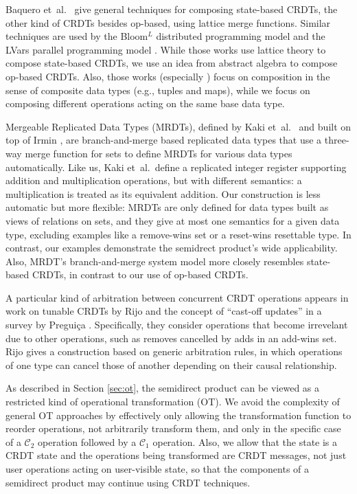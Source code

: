 \documentclass[acmsmall,nonacm,12pt]{acmart}
\newcommand{\mc}[1]{\ensuremath{\mathcal{#1}}}
\theoremstyle{plain}
\theoremstyle{definition}
\begin{document}
Baquero et~al.\ \cite{state_based_patterns} give general techniques for composing state-based CRDTs, the other kind of CRDTs besides op-based, using lattice merge functions.  Similar techniques are used by the Bloom$\mbox{}^L$ distributed programming model \cite{bloom_lattices} and the LVars parallel programming model \cite{lvars}.  While those works use lattice theory to compose state-based CRDTs, we use an idea from abstract algebra to compose op-based CRDTs.  Also, those works (especially \cite{bloom_lattices, lvars}) focus on composition in the sense of composite data types (e.g., tuples and maps), while we focus on composing different operations acting on the same base data type.

Mergeable Replicated Data Types (MRDTs), defined by Kaki et~al.\ \cite{mrdts} and built on top of Irmin \cite{irmin}, are branch-and-merge based replicated data types that use a three-way merge function for sets to define MRDTs for various data types automatically.  Like us, Kaki et~al.\ define a replicated integer register supporting addition and multiplication operations, but with different semantics: a multiplication is treated as its equivalent addition.  Our construction is less automatic but more flexible: MRDTs are only defined for data types built as views of relations on sets, and they give at most one semantics for a given data type, excluding examples like a remove-wins set or a reset-wins resettable type.  In contrast, our examples demonstrate the semidrect product's wide applicability.  Also, MRDT's branch-and-merge system model more closely resembles state-based CRDTs, in contrast to our use of op-based CRDTs.

A particular kind of arbitration between concurrent CRDT operations appears in work on tunable CRDTs by Rijo \cite{tunable_crdts} and the concept of ``cast-off updates'' in a survey by Pregui\c{c}a \cite{crdt_overview_preguica}.  Specifically, they consider operations that become irrevelant due to other operations, such as removes cancelled by adds in an add-wins set.  Rijo gives a construction based on generic arbitration rules, in which operations of one type can cancel those of another depending on their causal relationship.  %

As described in Section \ref{sec:ot}, the semidirect product can be viewed as a restricted kind of operational transformation (OT).  We avoid the complexity of general OT approaches by effectively only allowing the transformation function to reorder operations, not arbitrarily transform them, and only in the specific case of a $\mc{C}_2$ operation followed by a $\mc{C}_1$ operation.  Also, we allow that the state is a CRDT state and the operations being transformed are CRDT messages, not just user operations acting on user-visible state, so that the components of a semidirect product may continue using CRDT techniques.
\end{document}
